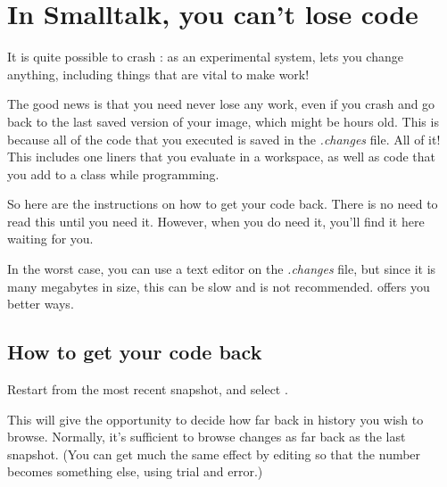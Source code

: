 \documentclass[a4paper,10pt,twoside]{book}
\begin{document}
\section{In Smalltalk, you can't lose code}

It is quite possible to crash \pharo: as an experimental system, \pharo lets you change anything, including things that are vital to make \pharo work! 


The good news is that you need never lose any work, even if you crash and go back to the last saved version of your image, which might be hours old.
This is because all of the code that you executed is saved in the \emph{.changes} file.
All of it!
This includes one liners that you evaluate in a workspace, as well as code that you add to a class while programming.

So here are the instructions on how to get your code back.
There is no need to read this until you need it. 
However, when you do need it, you'll find it here waiting for you.

In the worst case, you can use a text editor on the \emph{.changes} file, but since it is many megabytes in size, this can be slow and is not recommended. 
\pharo offers you better ways.

\subsection{How to get your code back}
Restart \pharo from the most recent snapshot, and select . 




This will give the opportunity to decide how far back in history you wish to browse. 
Normally, it's sufficient to browse changes as far back as the last snapshot. (You can get much the same effect by editing  so that the number  becomes something else, using trial and error.)
\end{document}
